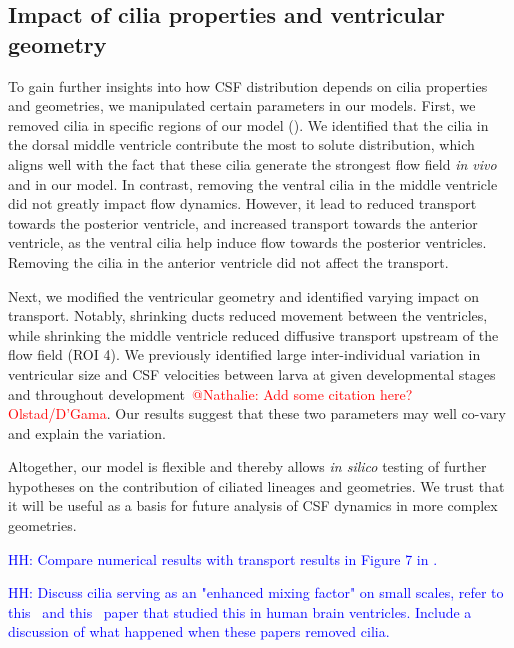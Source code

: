 \documentclass[fleqn]{wlscirep}
\newcommand{\lyng}[1]{\textcolor{blue}{#1}}
\newcommand{\fixme}[1]{\textcolor{red}{#1}}
\begin{document}
\subsection*{Impact of cilia properties and ventricular geometry}
To gain further insights into how CSF distribution depends on cilia properties and geometries,
we manipulated certain parameters in our models. First, we removed cilia in specific regions of
our model (). We identified that the cilia in the
dorsal middle ventricle contribute the most to solute distribution, which aligns well with the fact
that these cilia generate the strongest flow field \emph{in vivo} and in our model.
In contrast, removing the ventral cilia in the middle ventricle did not greatly impact flow dynamics.
However, it lead to reduced transport towards the posterior ventricle,
and increased transport towards the anterior ventricle, as the ventral cilia help induce
flow towards the posterior ventricles. Removing the cilia in the anterior ventricle did not affect the transport.

Next, we modified the ventricular geometry and identified varying impact on transport.
Notably, shrinking ducts reduced movement between the ventricles, while shrinking the middle ventricle
reduced diffusive transport upstream of the flow field (ROI 4).
We previously identified large inter-individual variation in ventricular size and
CSF velocities between larva at given developmental stages and throughout development~\fixme{@Nathalie: Add some citation here? Olstad/D'Gama}.
Our results suggest that these two parameters may well co-vary and explain the variation.

Altogether, our model is flexible and thereby allows \emph{in silico} testing of
further hypotheses on the contribution of ciliated lineages and geometries.
We trust that it will be useful as a basis for future analysis of CSF dynamics in more complex geometries.

\lyng{HH: Compare numerical results with transport results in Figure 7 in \cite{Olstad2019CiliaryDevelopment}.}

\lyng{HH: Discuss cilia serving as an "enhanced mixing factor" on small scales,
refer to this~\cite{Siyahhan2014FlowVentricles} and this~\cite{Yoshida2022EffectVentricles}
paper that studied this in human brain ventricles. Include a discussion of what happened when these papers removed cilia.}
\end{document}
